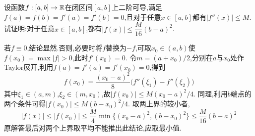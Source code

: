 \documentclass{ctexart}
\begin{document}
\begin{problem}[9.(10\songti{分})]
设函数$f:[a,b]\to\mathbb{R}$在闭区间$[a,b]$上二阶可导,满足$f(a)=f(b)=f'(a)=f'(b)=0$,且对于任意$x\in[a,b]$都有$|f''(x)|\leqslant M$.试证明:对于任意$x\in[a,b]$,都有$|f(x)|\leqslant\dfrac{M}{16}(b-a)^2$.
\end{problem}
\begin{solution}
若$f\equiv0$,结论显然.否则,必要时将$f$替换为$-f$,可取$x_0\in(a,b)$使$f(x_0)=\max|f|>0$,此时$f'(x_0)=0$.
令$m=(a+x_0)/2$,分别在$a$与$x_0$处作Taylor展开,利用$f(a)=f'(a)=f'(x_0)=0$,得到
\[f(x_0)=\dfrac{(x_0-a)^2}{8}\bigl(f''(\xi_1)-f''(\xi_2)\bigr)\]
其中$\xi_1\in(a,m)$,$\xi_2\in(m,x_0)$,故$|f(x_0)|\leqslant M(x_0-a)^2/4$.
同理,利用$b$端点的两个条件可得$|f(x_0)|\leqslant M(b-x_0)^2/4$.
取两上界的较小者,
\[|f(x)|\leqslant|f(x_0)|\leqslant\dfrac M4\min\{(x_0-a)^2,(b-x_0)^2\}
\leqslant\dfrac M{16}(b-a)^2\]
原解答最后对两个上界取平均不能推出此结论,应取最小值.
\end{solution}
\end{document}
